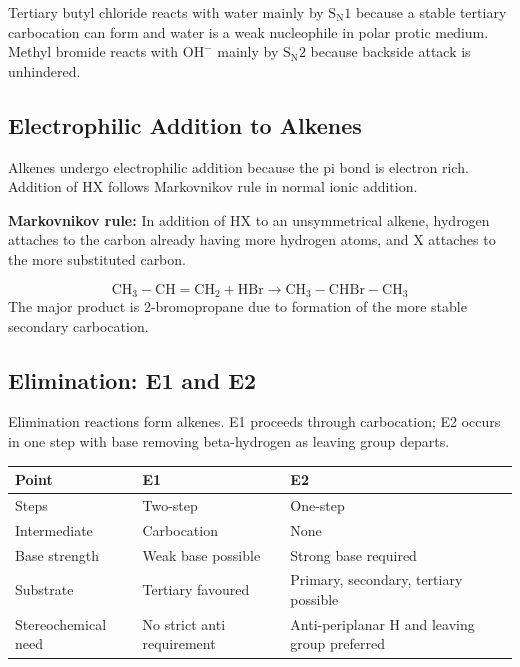 \documentclass[12pt,a4paper]{article}
\begin{document}
\begin{tcolorbox}[examplebox, title={Solved Concept: Choosing SN1 or SN2}]
Tertiary butyl chloride reacts with water mainly by $\mathrm{S_N1}$ because a stable tertiary carbocation can form and water is a weak nucleophile in polar protic medium. Methyl bromide reacts with $\mathrm{OH^-}$ mainly by $\mathrm{S_N2}$ because backside attack is unhindered.
\end{tcolorbox}

\subsection{Electrophilic Addition to Alkenes}
Alkenes undergo electrophilic addition because the pi bond is electron rich. Addition of HX follows Markovnikov rule in normal ionic addition.

\begin{tcolorbox}[defbox]
\textbf{Markovnikov rule:} In addition of HX to an unsymmetrical alkene, hydrogen attaches to the carbon already having more hydrogen atoms, and X attaches to the more substituted carbon.
\end{tcolorbox}

\begin{tcolorbox}[formulabox, title={Addition of HBr to Propene}]
\[
\mathrm{CH_3-CH=CH_2+HBr\rightarrow CH_3-CHBr-CH_3}
\]
The major product is 2-bromopropane due to formation of the more stable secondary carbocation.
\end{tcolorbox}

\subsection{Elimination: E1 and E2}
Elimination reactions form alkenes. E1 proceeds through carbocation; E2 occurs in one step with base removing beta-hydrogen as leaving group departs.

\begin{tabularx}{\linewidth}{|B{3cm}|Y|Y|}
\hline
\textbf{Point} & \textbf{E1} & \textbf{E2} \\
\hline
Steps & Two-step & One-step \\
\hline
Intermediate & Carbocation & None \\
\hline
Base strength & Weak base possible & Strong base required \\
\hline
Substrate & Tertiary favoured & Primary, secondary, tertiary possible \\
\hline
Stereochemical need & No strict anti requirement & Anti-periplanar H and leaving group preferred \\
\hline
\end{tabularx}
\end{document}

